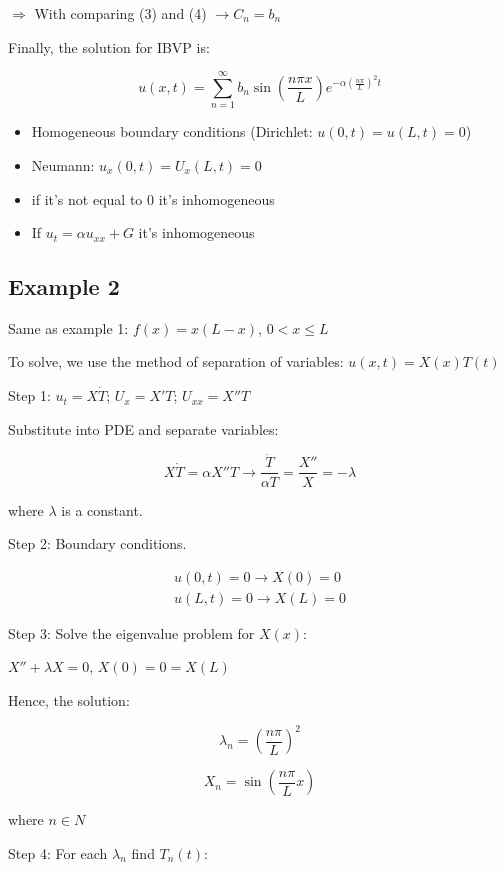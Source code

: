 \hfill

$\Rightarrow$ With comparing (3) and (4) $\rightarrow C_n = b_n$

Finally, the solution for IBVP is:

$$u(x,t) = \sum_{n = 1}^\infty b_n \sin (\frac{n \pi x}{L}) e^{- \alpha \left( \frac{n \pi}{L} \right)^2 t}$$

\begin{itemize}
    \item Homogeneous boundary conditions (Dirichlet: $u(0,t) = u(L,t) = 0$)
    \item Neumann: $u_x(0,t) = U_x (L,t) = 0$
    \item if it's not equal to 0 it's inhomogeneous
    \item If $u_t = \alpha u_{xx} + G$ it's inhomogeneous
\end{itemize}

\subsection{Example 2}

Same as example 1: $f(x) = x(L - x)$, $0 < x \leq L$

To solve, we use the method of separation of variables: $u(x,t) = X(x) T(t)$

Step 1: $u_t = X \dot{T}$; $U_x = X' T$; $U_{xx} = X'' T$

Substitute into PDE and separate variables:

$$X \dot{T} = \alpha X'' T \longrightarrow \frac{\dot{T}}{\alpha T} = \frac{X''}{X} = -\lambda$$

where $\lambda$ is a constant. 

Step 2: Boundary conditions. 

$$\begin{matrix} u(0,t) = 0 \longrightarrow X(0) = 0 \\ u(L,t) = 0 \longrightarrow X(L) = 0 \end{matrix}$$

Step 3: Solve the eigenvalue problem for $X(x)$:

$X'' + \lambda X = 0$, $X(0) = 0 = X(L)$

Hence, the solution:

$$\lambda_n = \left( \frac{n \pi}{L} \right)^2$$

$$X_n = \sin(\frac{n \pi}{L} x)$$

where $n \in N$

Step 4: For each $\lambda_n$ find $T_n(t)$:

